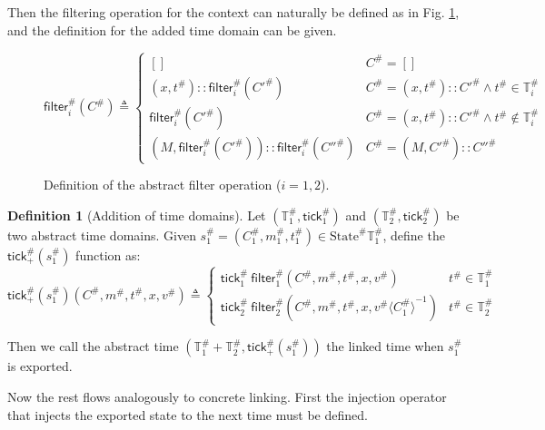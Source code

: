 \documentclass[acmsmall,review]{acmart}\settopmatter{printfolios=true,printccs=false,printacmref=false}
\theoremstyle{definition}
\newtheorem{definition}{Definition}[section]
\newcommand*{\cons}{::}
\newcommand*{\A}[1]{{#1}^{\#}}
\newcommand*{\Time}{\mathbb{T}}
\newcommand*{\ATime}{\A{\Time}}
\newcommand*{\mem}{m}
\newcommand*{\AState}{\A{\text{State}}}
\newcommand*{\tick}{\mathsf{tick}}
\newcommand*{\delete}[2]{{#2}{\langle{#1}\rangle}^{-1}}
\newcommand*{\filter}{\mathsf{filter}}
\begin{document}
Then the filtering operation for the context can naturally be defined as in Fig. \ref{fig:absfilter}, and the definition for the added time domain can be given.
\begin{figure}[h!]
  \footnotesize
  \[
    \A\filter_i(\A{C})\triangleq
    \begin{cases}
      []                                               & \A{C}=[]                                                \\
      (x,\A{t})\cons\A\filter_i(\A{C'})                & \A{C}=(x,\A{t})\cons \A{C'}\wedge \A{t}\in\A\Time_i     \\
      \A\filter_i(\A{C'})                              & \A{C}=(x,\A{t})\cons \A{C'}\wedge \A{t}\not\in\A\Time_i \\
      (M,\A\filter_i(\A{C'}))\cons\A\filter_i(\A{C''}) & \A{C}=(M, \A{C'})\cons \A{C''}
    \end{cases}
  \]
  \caption{Definition of the abstract filter operation ($i=1,2$).}
  \label{fig:absfilter}
\end{figure}

\begin{definition}[Addition of time domains]
  Let $(\ATime_1,\A\tick_1)$ and $(\ATime_2,\A\tick_2)$ be two abstract time domains.
  Given $\A{s}_1=(\A{C}_1,\A\mem_1,\A{t}_1)\in\AState{\ATime_1}$, define the $\A{\tick}_+(\A{s}_1)$ function as:
  \[
    \A\tick_{+}(\A{s}_1)(\A{C},\A\mem,\A{t},x,\A{v})\triangleq
    \begin{cases}
      \A{\tick}_1\:\A\filter_1(\A{C},\A\mem,\A{t},x,\A{v})                   & \A{t}\in\ATime_1 \\
      \A{\tick}_2\:\A\filter_2(\delete{\A{C}_1}{\A{C},\A\mem,\A{t},x,\A{v}}) & \A{t}\in\ATime_2
    \end{cases}
  \]

  Then we call the abstract time $(\ATime_1+\ATime_2,\A\tick_{+}(\A{s}_1))$ the linked time when $\A{s}_1$ is exported.
\end{definition}

Now the rest flows analogously to concrete linking.
First the injection operator that injects the exported state to the next time must be defined.
\end{document}
